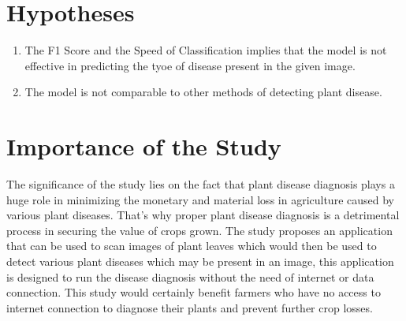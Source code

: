 \section{Hypotheses}
    \begin{enumerate}
        \item The F1 Score and the Speed of Classification implies that
              the model is not effective in predicting the tyoe of disease 
              present in the given image.
        \item The model is not comparable to other methods of detecting plant
              disease.
    \end{enumerate}

\section{Importance of the Study}
The significance of the study lies on the
fact that plant disease diagnosis plays a huge role 
in minimizing the monetary and material loss in
agriculture caused by various plant diseases.  
That’s why proper plant disease diagnosis is a
detrimental process in securing the value of 
crops grown. The study proposes an application 
that can be used to scan images of plant leaves 
which would then be used to detect various plant 
diseases which may be present in an image, this 
application is designed to run the disease diagnosis 
without the need of internet or data connection.
This study would certainly benefit farmers who 
have no access to internet connection to diagnose
their plants and prevent further crop losses. 



